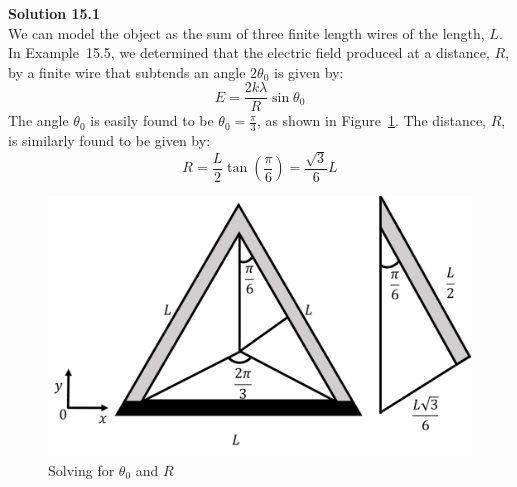 \begin{framed}
\textbf{Solution 15.1}\\
We can model the object as the sum of three finite length wires of the length, $L$. In Example~15.5, we determined that the electric field produced at a distance, $R$, by a finite wire that subtends an angle $2\theta_0$ is given by:
\begin{equation}
E = \frac{2k\lambda}{R}\sin\theta_0
\end{equation}
The angle $\theta_0$ is easily found to be $\theta_0 = \frac{\pi}{3}$, as shown in Figure~\ref{fig:ChargesFields:trianglesolution}. The distance, $R$, is similarly found to be given by:
\begin{equation}
R = \frac{L}{2}\tan\left(\frac{\pi}{6}\right)=\frac{\sqrt{3}}{6}L
\end{equation}
\begin{figure}[!htbp]
\centering
\includegraphics[width=0.6\linewidth]{files/trianglesolution-2125f2bf1c8dc2704b3068619355f64e.png}
\caption[]{Solving for $\theta_0$ and $R$}
\label{fig:ChargesFields:trianglesolution}
\end{figure}


\end{framed}
